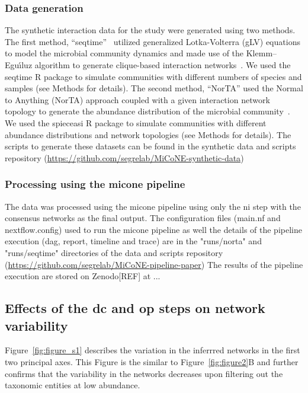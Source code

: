     \subsubsection*{Data generation}
    The synthetic interaction data for the study were generated using two methods.
    The first method, ``seqtime''~\cite{faustSignaturesEcologicalProcesses2018} utilized generalized Lotka-Volterra (gLV) equations to model the microbial community dynamics and made use of the Klemm–Eguı́luz algorithm to generate clique-based interaction networks~\cite{Rottjers2018}.
    We used the seqtime R package to simulate communities with different numbers of species and samples (see Methods for details).
    The second method, ``NorTA'' used the Normal to Anything (NorTA) approach coupled with a given interaction network topology to generate the abundance distribution of the microbial community~\cite{Kurtz2015}.
    We used the spieceasi R package to simulate communities with different abundance distributions and network topologies (see Methods for details).
    The scripts to generate these datasets can be found in the synthetic data and scripts repository (\href{https://github.com/segrelab/MiCoNE-synthetic-data}{https://github.com/segrelab/MiCoNE-synthetic-data})

    \subsubsection*{Processing using the \ac{micone} pipeline}
    The data was processed using the \ac{micone} pipeline using only the \ac{ni} step with the consensus networks as the final output.
    The configuration files (main.nf and nextflow.config) used to run the \ac{micone} pipeline as well the details of the pipeline execution (dag, report, timeline and trace) are in the "runs/norta" and "runs/seqtime" directories of the data and scripts repository (\href{https://github.com/segrelab/MiCoNE-pipeline-paper}{https://github.com/segrelab/MiCoNE-pipeline-paper})
    The results of the pipeline execution are stored on Zenodo[REF] at ...

  \subsection*{Effects of the \ac{dc} and \ac{op} steps on network variability}

    Figure~\ref{fig:figure_s1} describes the variation in the inferrred networks in the first two principal axes.
    This Figure is the similar to Figure~\ref{fig:figure2}B and further confirms that the variability in the networks decreases upon filtering out the taxonomic entities at low abundance.

